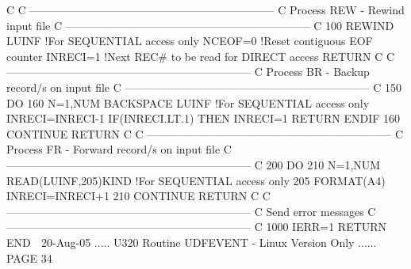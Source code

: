  
   C
   C     ------------------------------------------------------------------
   C     Process REW  -  Rewind input file
   C     ------------------------------------------------------------------
   C
     100 REWIND LUINF               !For SEQUENTIAL access only
         NCEOF=0                    !Reset contiguous EOF counter
         INRECI=1                   !Next REC# to be read for DIRECT access
         RETURN
   C
   C     ------------------------------------------------------------------
   C     Process BR   -  Backup record/s on input file
   C     ------------------------------------------------------------------
   C
     150 DO 160 N=1,NUM
         BACKSPACE LUINF            !For SEQUENTIAL access only
         INRECI=INRECI-1
         IF(INRECI.LT.1) THEN
         INRECI=1
         RETURN
         ENDIF
     160 CONTINUE
         RETURN
   C
   C     ------------------------------------------------------------------
   C     Process FR   -  Forward record/s on input file
   C     ------------------------------------------------------------------
   C
     200 DO 210 N=1,NUM
         READ(LUINF,205)KIND         !For SEQUENTIAL access only
     205 FORMAT(A4)
         INRECI=INRECI+1
     210 CONTINUE
         RETURN
   C
   C     ------------------------------------------------------------------
   C     Send error messages
   C     ------------------------------------------------------------------
   C
    1000 IERR=1
         RETURN
         END
    
   20-Aug-05 ..... U320  Routine UDFEVENT - Linux Version Only ...... PAGE  34
 
